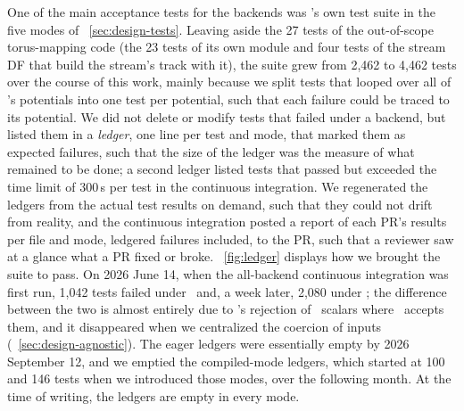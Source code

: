 One of the main acceptance tests for the backends was \galpy's own test
suite in the five modes of \sectionname~\ref{sec:design-tests}. Leaving
aside the 27 tests of the out-of-scope torus-mapping code (the 23 tests
of its own module and four tests of the stream DF that build the
stream's track with it), the suite grew from 2,462 to 4,462 tests over
the course of this work, mainly because we split tests that looped over
all of \galpy's potentials into one test per potential, such that each
failure could be traced to its potential. We did not delete or modify
tests that failed under a backend, but listed them in a \emph{ledger},
one line per test and mode, that marked them as expected failures, such
that the size of the ledger was the measure of what remained to be
done; a second ledger listed tests that passed but exceeded the time
limit of 300\,s per test in the continuous integration. We regenerated
the ledgers from the actual test results on demand, such that they
could not drift from reality, and the continuous integration posted a
report of each PR's results per file and mode, ledgered failures
included, to the PR, such that a reviewer saw at a glance what a PR
fixed or broke. \figurename~\ref{fig:ledger} displays how we brought
the suite to pass. On 2026 June 14, when the all-backend continuous
integration was first run, 1,042 tests failed under \jax\ and, a week
later, 2,080 under \torch; the difference between the two is almost
entirely due to \torch's rejection of \python\ scalars where \jax\
accepts them, and it disappeared when we centralized the coercion of
inputs (\sectionname~\ref{sec:design-agnostic}). The eager ledgers were
essentially empty by 2026 September 12, and we emptied the compiled-mode
ledgers, which started at 100 and 146 tests when we introduced those
modes, over the following month. At the time of writing, the ledgers
are empty in every mode.

